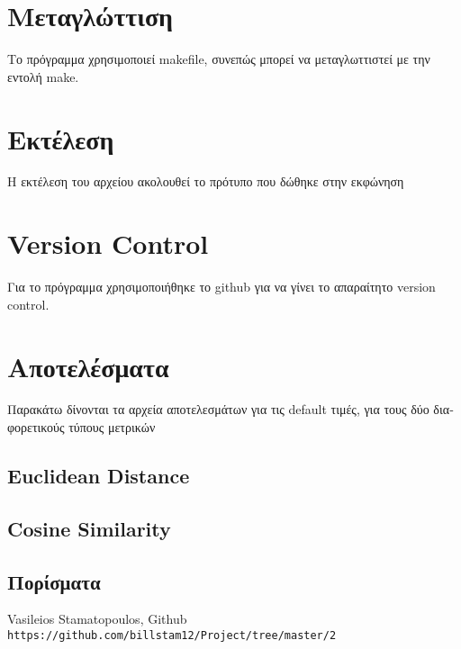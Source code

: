 \documentclass{article}
\begin{document}
\begin{enumerate}
\section{ \textgreek{Μεταγλώττιση}}
\textgreek{Το πρόγραμμα χρησιμοποιεί }makefile, \textgreek{συνεπώς μπορεί να μεταγλωττιστεί με την εντολή }make.
\section{\textgreek{Εκτέλεση}}
\textgreek{Η εκτέλεση του αρχείου ακολουθεί το πρότυπο που δώθηκε στην εκφώνηση}
\section{Version Control}
\textgreek{Για το πρόγραμμα χρησιμοποιήθηκε το} github \textgreek{για να γίνει το απαραίτητο }version control.\cite{mygit}

\section{\textgreek{Αποτελέσματα}}
\textgreek{Παρακάτω δίνονται τα αρχεία αποτελεσμάτων για τις} default \textgreek{τιμές, για τους δύο διαφορετικούς τύπους μετρικών} 
\subsection{Euclidean Distance}

\subsection{Cosine Similarity}

\subsection{\textgreek{Πορίσματα}}
\begin{thebibliography}{3}
Vasileios Stamatopoulos, Github
\\\texttt{https://github.com/billstam12/Project/tree/master/2}
\end{thebibliography}
 

\end{enumerate}
\end{document}
